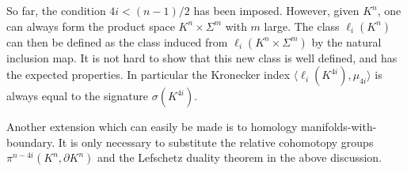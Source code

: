 \documentclass[../main]{subfiles}
\begin{document}
So far, the condition $4i < (n-1)/2$ has been imposed. However, given $K^n$, one can always form the product space $K^n \times \Sigma^m$ with $m$ large. The class $\ell_i(K^n)$ can then be defined as the class induced from $\ell_i(K^n \times \Sigma^m)$ by the natural inclusion map. It is not hard to show that this new class is well defined, and has the expected properties. In particular the Kronecker index $\langle \ell_i(K^{4i}),\mu_{4i}\rangle$ is always equal to the signature $\sigma(K^{4i})$.

Another extension which can easily be made is to homology manifolds-with-boundary. It is only necessary to substitute the relative cohomotopy groups $\pi^{n-4i}(K^n,\partial K^n)$ and the Lefschetz duality theorem in the above discussion.
\end{document}
